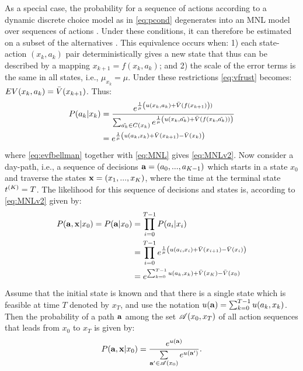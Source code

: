 As a special case, the probability for a sequence of actions according to a dynamic discrete choice model as in \eqref{eq:pcond} degenerates into an MNL model over sequences of actions \citep{fosgerau2013}. Under these conditions, it can therefore be estimated on a subset of the alternatives \citep{mcfadden78}. This equivalence occurs when: 1) each state-action $(x_{k},a_{k})$ pair deterministically gives a new state that thus can be described by a mapping $x_{k+1}=f(x_{k},a_{k})$; and 2) the scale of the error terms is the same in all states, i.e., $\mu_{x_k}=\mu$. Under these restrictions \eqref{eq:vfrust} becomes: $EV(x_{k},a_{k})=\bar{V}(x_{k+1})$. Thus:
\begin{align}
P(a_k|x_k) &= \frac{e^{\frac{1}{\mu}\left(\avgu(x_k,a_k) + \ev(f(x_{k+1})\right))}}{\sum_{\akt \in C(x_k)}e^{\frac{1}{\mu}\left(\avgu(x_k,\akt) + \ev(f(x_k,\akt))\right)}} \label{eq:MNL}\\
&=e^{\frac{1}{\mu}\left(\avgu(a_k,x_k) + \ev(x_{k+1})- \ev(x_k)\right)}\label{eq:MNLv2}
\end{align}
where \eqref{eq:evfbellman} together with \eqref{eq:MNL} gives \eqref{eq:MNLv2}. Now consider a day-path, i.e., a sequence of decisions  ${\bf a} = (a_0,...,a_{K-1})$ which starts in a state $x_0$ and traverse the states ${\bf x} = (x_1,...,x_{K})$, where the time at the terminal state $t^{(K)}=T$. The likelihood for this sequence of decisions and states is, according to \eqref{eq:MNLv2} given by:
\begin{equation}\label{eq:pPath0}
\begin{aligned}
P(\ve{a},\ve{x}|x_0) = P(\ve{a}|x_0) &= \prod_{i=0}^{T-1}P(a_i|x_i) \\
& = \prod_{i=0}^{T-1} e^{\frac{1}{\mu}\left(\avgu(a_i,x_i) + \ev(x_{i+1})-\ev(x_i)\right)} \\
& =  e^{\sum_{k=0}^{T-1} \avgu(a_k,x_k) + \ev(x_{K})-\ev(x_0)} 
\end{aligned}
\end{equation}
Assume that the initial state is known and that there is a single state which is feasible at time $T$ denoted by $x_T$, and use the notation $u({\bf a})=\sum_{k=0}^{T-1} u(a_k,x_k)$. Then the probability of a path ${\bf a}$ among the set $\mathscr{A}(x_0,x_T)$ of all action sequences that leads from $x_0$ to $x_T$ is given by:
\begin{equation}
P(\ve{a},\ve{x}|x_0) = \frac{e^{u(\ve{a})}}{\sum\limits_{\ve{a'} \in \Agood(x_0)}e^{u(\ve{a'})} }.
\end{equation}

